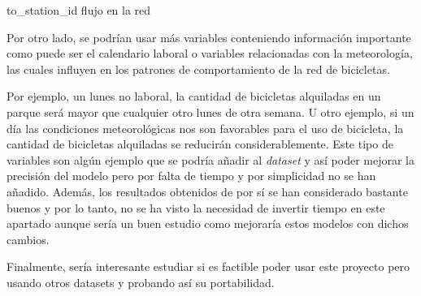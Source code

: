 to\_station\_id flujo en la red


Por otro lado, se podrían usar más variables conteniendo información importante como puede ser el calendario laboral o variables relacionadas con la meteorología, las cuales influyen en los patrones de comportamiento de la red de bicicletas.
\newline

Por ejemplo, un lunes no laboral, la cantidad de bicicletas alquiladas en un parque será mayor que cualquier otro lunes de otra semana. U otro ejemplo, si un día las condiciones meteorológicas nos son favorables para el uso de bicicleta, la cantidad de bicicletas alquiladas se reducirán considerablemente. Este tipo de variables son algún ejemplo que se podría añadir al \textit{dataset} y así poder mejorar la precisión del modelo pero por falta de tiempo y por simplicidad no se han añadido. Además, los resultados obtenidos de por sí se han considerado bastante buenos y por lo tanto, no se ha visto la necesidad de invertir tiempo en este apartado aunque sería un buen estudio como mejoraría estos modelos con dichos cambios.
\newline


Finalmente, sería interesante estudiar si es factible poder usar este proyecto pero usando otros datasets y probando así su portabilidad.



